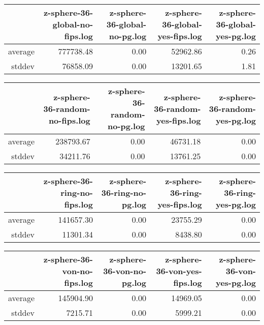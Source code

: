 \begin{table}[ht]
\centering
\begin{tabular}{rrrrr}
  \hline
 & z-sphere-36-global-no-fips.log & z-sphere-36-global-no-pg.log & z-sphere-36-global-yes-fips.log & z-sphere-36-global-yes-pg.log \\ 
  \hline
average & 777738.48 & 0.00 & 52962.86 & 0.26 \\ 
  stddev & 76858.09 & 0.00 & 13201.65 & 1.81 \\ 
   \hline
\end{tabular}
\end{table}
\begin{table}[ht]
\centering
\begin{tabular}{rrrrr}
  \hline
 & z-sphere-36-random-no-fips.log & z-sphere-36-random-no-pg.log & z-sphere-36-random-yes-fips.log & z-sphere-36-random-yes-pg.log \\ 
  \hline
average & 238793.67 & 0.00 & 46731.18 & 0.00 \\ 
  stddev & 34211.76 & 0.00 & 13761.25 & 0.00 \\ 
   \hline
\end{tabular}
\end{table}
\begin{table}[ht]
\centering
\begin{tabular}{rrrrr}
  \hline
 & z-sphere-36-ring-no-fips.log & z-sphere-36-ring-no-pg.log & z-sphere-36-ring-yes-fips.log & z-sphere-36-ring-yes-pg.log \\ 
  \hline
average & 141657.30 & 0.00 & 23755.29 & 0.00 \\ 
  stddev & 11301.34 & 0.00 & 8438.80 & 0.00 \\ 
   \hline
\end{tabular}
\end{table}
\begin{table}[ht]
\centering
\begin{tabular}{rrrrr}
  \hline
 & z-sphere-36-von-no-fips.log & z-sphere-36-von-no-pg.log & z-sphere-36-von-yes-fips.log & z-sphere-36-von-yes-pg.log \\ 
  \hline
average & 145904.90 & 0.00 & 14969.05 & 0.00 \\ 
  stddev & 7215.71 & 0.00 & 5999.21 & 0.00 \\ 
   \hline
\end{tabular}
\end{table}
